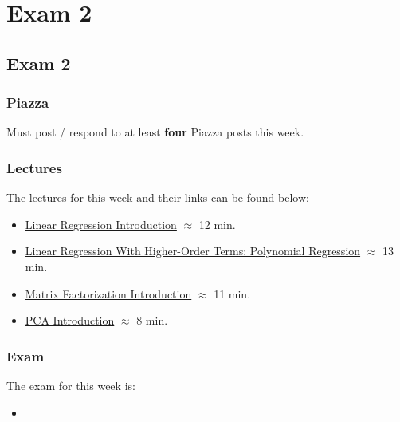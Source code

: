 \clearpage

\renewcommand{\ChapTitle}{Exam 2}
\renewcommand{\SectionTitle}{Exam 2}

\chapter{\ChapTitle}
\section{\SectionTitle}

\subsection{Piazza}

Must post / respond to at least \textbf{four} Piazza posts this week.

\subsection{Lectures}

The lectures for this week and their links can be found below:

\begin{itemize}
    \item \href{https://applied.cs.colorado.edu/mod/hvp/view.php?id=52239}{Linear Regression Introduction} $\approx$ 12 min.
    \item \href{https://applied.cs.colorado.edu/mod/hvp/view.php?id=52240}{Linear Regression With Higher-Order Terms: Polynomial Regression} $\approx$ 13 min.
    \item \href{https://applied.cs.colorado.edu/mod/hvp/view.php?id=52242}{Matrix Factorization Introduction} $\approx$ 11 min.
    \item \href{https://applied.cs.colorado.edu/mod/hvp/view.php?id=52241}{PCA Introduction} $\approx$ 8 min.
\end{itemize}

\subsection{Exam}

The exam for this week is:

\begin{itemize}
    \item {}
\end{itemize}